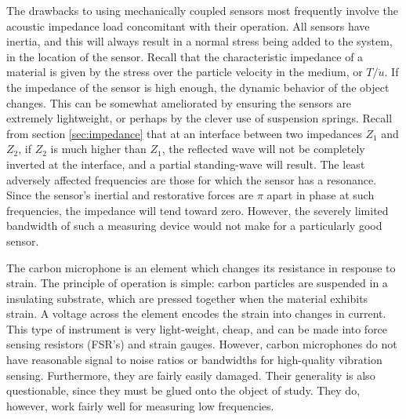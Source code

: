 \documentclass[a4paper,10pt]{report}
\numberwithin{equation}{section}
\begin{document}
The drawbacks to using mechanically coupled sensors most frequently involve the acoustic impedance load concomitant with their operation. All sensors have inertia, and this will always result in a normal stress being added to the system, in the location of the sensor. Recall that the characteristic impedance of a material is given by the stress over the particle velocity in the medium, or $T/\dot{u}$. If the impedance of the sensor is high enough, the dynamic behavior of the object changes. This can be somewhat ameliorated by ensuring the sensors are extremely lightweight, or perhaps by the clever use of suspension springs. \cite[p.~4]{Cremer1973} Recall from section \ref{sec:impedance} that at an interface between two impedances $Z_1$ and $Z_2$, if $Z_2$ is much higher than $Z_1$, the reflected wave will not be completely inverted at the interface, and a partial standing-wave will result. The least adversely affected frequencies are those for which the sensor has a resonance. Since the sensor's inertial and 
restorative forces are $\pi$ apart in phase at such frequencies, the impedance will tend toward zero. However, the severely limited bandwidth of such a measuring device would not make for a particularly good sensor. \cite[p.~9]{Cremer1973} 

The carbon microphone is an element which changes its resistance in response to strain. The principle of operation is simple: carbon particles are suspended in a insulating substrate, which are pressed together when the material exhibits strain. A voltage across the element encodes the strain into changes in current. This type of instrument is very light-weight, cheap, and can be made into force sensing resistors (FSR's) and strain gauges. However, carbon microphones do not have reasonable signal to noise ratios or bandwidths for high-quality vibration sensing. Furthermore, they are fairly easily damaged. Their generality is also questionable, since they must be glued onto the object of study. They do, however, work fairly well for measuring low frequencies. \cite[p~.26]{Cremer1973}
\end{document}
